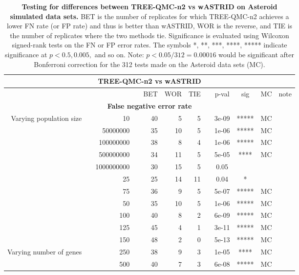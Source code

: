 \begin{table}[!h]
\caption[Statistical testing for TREE-QMC-n2 vs wASTRID on Asteroid data]{
\textbf{Testing for differences between TREE-QMC-n2 vs wASTRID on Asteroid simulated data sets.}
BET is the number of replicates for which TREE-QMC-n2 achieves a lower FN rate (or FP rate) and thus is better than wASTRID, WOR is the reverse, and TIE is the number of replicates where the two methods tie.
Significance is evaluated using Wilcoxon signed-rank tests on the FN or FP error rates.
The symbols *, **, ***, ****, ***** indicate significance at $p < 0.5, 0.005,$ and so on.
Note: $p < 0.05 / 312 = 0.00016$ would be significant after Bonferroni correction for the 312 tests made on the Asteroid data sets (MC).}
\centering
\scriptsize
\begin{tabular}{r r r l r r r l c c c l}
\toprule 
\multicolumn{12}{c}{\textbf{TREE-QMC-n2 vs wASTRID}} \\
\midrule
\multirow{ 1}{2cm}{}
& & & & BET & WOR & TIE & & p-val & sig & MC & note \\
\midrule
\multicolumn{12}{c}{\textbf{False negative error rate}} \\
\midrule
\multirow{ 6}{2cm}{Varying population size}
 & & 10 & & 40 & 5 & 5 & & 3e-09 & ***** & MC &  \\
   & & 50000000 & & 35 & 10 & 5 & & 1e-06 & ***** & MC &  \\
   & & 100000000 & & 38 & 8 & 4 & & 1e-06 & ***** & MC &  \\
   & & 500000000 & & 34 & 11 & 5 & & 5e-05 & **** & MC &  \\
   & & 1000000000 & & 30 & 15 & 5 & & 0.05 &  &  &  \\
\midrule
\multirow{ 6}{2cm}{Varying number of taxa}
   & & 25 & & 25 & 14 & 11 & & 0.04 & * &  &  \\
   & & 75 & & 36 & 9 & 5 & & 5e-07 & ***** & MC &  \\
   & & 50 & & 35 & 10 & 5 & & 1e-06 & ***** & MC &  \\
   & & 100 & & 40 & 8 & 2 & & 6e-09 & ***** & MC &  \\
   & & 125 & & 45 & 4 & 1 & & 3e-11 & ***** & MC &  \\
   & & 150 & & 48 & 2 & 0 & & 5e-13 & ***** & MC &  \\
\midrule
\multirow{ 4}{2cm}{Varying number of genes}
   & & 250 & & 38 & 9 & 3 & & 1e-05 & **** & MC &  \\
   & & 500 & & 40 & 7 & 3 & & 6e-08 & ***** & MC &  \\

\end{tabular}
\end{table}
